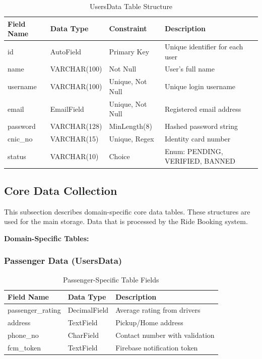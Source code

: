 \begin{table}[H]
\centering
\caption{UsersData Table Structure}
\renewcommand{\arraystretch}{1.5}
\begin{tabular}{|p{3cm}|p{3.5cm}|p{3cm}|p{5cm}|}
\hline
\textbf{Field Name} & \textbf{Data Type} & \textbf{Constraint} & \textbf{Description} \\
\hline
id & AutoField & Primary Key & Unique identifier for each user \\
\hline
name & VARCHAR(100) & Not Null & User's full name \\
\hline
username & VARCHAR(100) & Unique, Not Null & Unique login username \\
\hline
email & EmailField & Unique, Not Null & Registered email address \\
\hline
password & VARCHAR(128) & MinLength(8) & Hashed password string \\
\hline
cnic\_no & VARCHAR(15) & Unique, Regex & Identity card number \\
\hline
status & VARCHAR(10) & Choice & Enum: PENDING, VERIFIED, BANNED \\
\hline
\end{tabular}
\end{table}

\subsection{Core Data Collection}

This subsection describes domain-specific core data tables. These structures are used for the main storage. Data that is processed by the Ride Booking system.

\textbf{Domain-Specific Tables:}

\subsubsection{Passenger Data (UsersData)}
\begin{table}[H]
\centering
\caption{Passenger-Specific Table Fields}
\renewcommand{\arraystretch}{1.5}
\begin{tabular}{|p{3cm}|p{3.5cm}|p{7cm}|}
\hline
\textbf{Field Name} & \textbf{Data Type} & \textbf{Description} \\
\hline
passenger\_rating & DecimalField & Average rating from drivers \\
\hline
address & TextField & Pickup/Home address \\
\hline
phone\_no & CharField & Contact number with validation \\
\hline
fcm\_token & TextField & Firebase notification token \\
\hline
\end{tabular}
\end{table}

